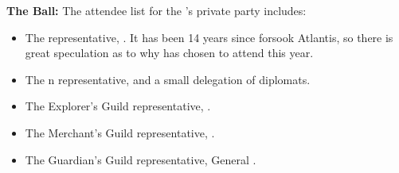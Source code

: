 \documentclass[blue]{NeptuneBall}
\begin{document}
{\bf The \cExExKing{} Ball:}
The attendee list for the \cKing{\King}'s private party includes:
\begin{itemize}
  \item The \pAmerica{} representative, \cAriel{\King} \cAriel{}. It has been 14 years since \cAriel{\MYname{}} forsook Atlantis, so there is great speculation as to why \cAriel{\they} has chosen to attend this year.
  \item The \pPacifica{}n representative, \cPrince{\Prince} \cPrince{} and a small delegation of diplomats.
  \item The Explorer's Guild representative, \cPriest{}.
  \item The Merchant's Guild representative, \cSlave{}.
  \item The Guardian's Guild representative, General \cGeneral{}.
\end{itemize}
\end{document}

